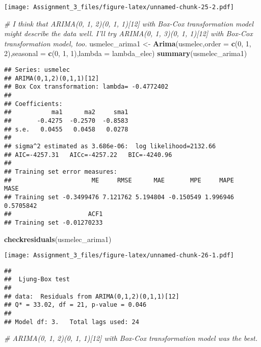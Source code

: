 \documentclass[]{article}
\newenvironment{Shaded}{\begin{snugshade}}{\end{snugshade}}
\newcommand{\KeywordTok}[1]{\textcolor[rgb]{0.13,0.29,0.53}{\textbf{#1}}}
\newcommand{\DataTypeTok}[1]{\textcolor[rgb]{0.13,0.29,0.53}{#1}}
\newcommand{\DecValTok}[1]{\textcolor[rgb]{0.00,0.00,0.81}{#1}}
\newcommand{\StringTok}[1]{\textcolor[rgb]{0.31,0.60,0.02}{#1}}
\newcommand{\CommentTok}[1]{\textcolor[rgb]{0.56,0.35,0.01}{\textit{#1}}}
\newcommand{\NormalTok}[1]{#1}
\begin{document}
\texttt{[image: Assignment\_3\_files/figure-latex/unnamed-chunk-25-2.pdf]}

\begin{Shaded}
\begin{Highlighting}[]
\CommentTok{# I think that ARIMA(0, 1, 2)(0, 1, 1)[12] with Box-Cox transformation model might describe the data well. I'll try ARIMA(0, 1, 3)(0, 1, 1)[12] with Box-Cox transformation model, too.}
\NormalTok{usmelec_arima1 <-}\StringTok{ }\KeywordTok{Arima}\NormalTok{(usmelec,}\DataTypeTok{order =} \KeywordTok{c}\NormalTok{(}\DecValTok{0}\NormalTok{, }\DecValTok{1}\NormalTok{, }\DecValTok{2}\NormalTok{),}\DataTypeTok{seasonal =} \KeywordTok{c}\NormalTok{(}\DecValTok{0}\NormalTok{, }\DecValTok{1}\NormalTok{, }\DecValTok{1}\NormalTok{),}\DataTypeTok{lambda =}\NormalTok{ lambda_elec)}
\KeywordTok{summary}\NormalTok{(usmelec_arima1)}
\end{Highlighting}
\end{Shaded}

\begin{verbatim}
## Series: usmelec 
## ARIMA(0,1,2)(0,1,1)[12] 
## Box Cox transformation: lambda= -0.4772402 
## 
## Coefficients:
##           ma1      ma2     sma1
##       -0.4275  -0.2570  -0.8583
## s.e.   0.0455   0.0458   0.0278
## 
## sigma^2 estimated as 3.686e-06:  log likelihood=2132.66
## AIC=-4257.31   AICc=-4257.22   BIC=-4240.96
## 
## Training set error measures:
##                      ME     RMSE      MAE       MPE     MAPE      MASE
## Training set -0.3499476 7.121762 5.194804 -0.150549 1.996946 0.5705842
##                     ACF1
## Training set -0.01270233
\end{verbatim}

\begin{Shaded}
\begin{Highlighting}[]
\KeywordTok{checkresiduals}\NormalTok{(usmelec_arima1)}
\end{Highlighting}
\end{Shaded}

\texttt{[image: Assignment\_3\_files/figure-latex/unnamed-chunk-26-1.pdf]}

\begin{verbatim}
## 
##  Ljung-Box test
## 
## data:  Residuals from ARIMA(0,1,2)(0,1,1)[12]
## Q* = 33.02, df = 21, p-value = 0.046
## 
## Model df: 3.   Total lags used: 24
\end{verbatim}

\begin{Shaded}
\begin{Highlighting}[]
\CommentTok{# ARIMA(0, 1, 2)(0, 1, 1)[12] with Box-Cox transformation model was the best.}
\end{Highlighting}
\end{Shaded}
\end{document}
